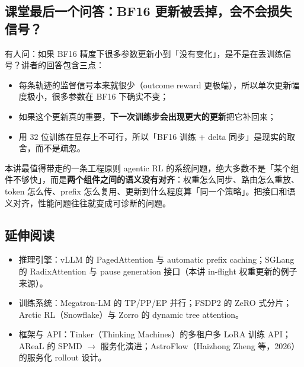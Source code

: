 \documentclass[a4paper]{article}
\begin{document}
\subsection{课堂最后一个问答：BF16 更新被丢掉，会不会损失信号？}

有人问：如果 BF16 精度下很多参数更新小到「没有变化」，是不是在丢训练信号？讲者的回答包含三点：

\begin{itemize}
\item 每条轨迹的监督信号本来就很少（outcome reward 更极端），所以单次更新幅度极小，很多参数在 BF16 下确实不变；
\item 如果这个更新真的重要，\textbf{下一次训练步会出现更大的更新}把它补回来；
\item 用 32 位训练在显存上不可行，所以「BF16 训练 + delta 同步」是现实的取舍，而不是疏忽。
\end{itemize}

\begin{importantbox}{本讲最值得带走的一条工程原则}
agentic RL 的系统问题，绝大多数不是「某个组件不够快」，而是\textbf{两个组件之间的语义没有对齐}：权重怎么同步、路由怎么重放、token 怎么传、prefix 怎么复用、更新到什么程度算「同一个策略」。把接口和语义对齐，性能问题往往就变成可诊断的问题。
\end{importantbox}

\subsection{延伸阅读}

\begin{itemize}
\item 推理引擎：vLLM 的 PagedAttention 与 automatic prefix caching；SGLang 的 RadixAttention 与 pause generation 接口（本讲 in-flight 权重更新的例子来源）。
\item 训练系统：Megatron-LM 的 TP/PP/EP 并行；FSDP2 的 ZeRO 式分片；Arctic RL（Snowflake）与 Zorro 的 dynamic tree attention。
\item 框架与 API：Tinker（Thinking Machines）的多租户多 LoRA 训练 API；AReaL 的 SPMD $\rightarrow$ 服务化演进；AstroFlow（Haizhong Zheng 等，2026）的服务化 rollout 设计。
\end{itemize}
\end{document}
